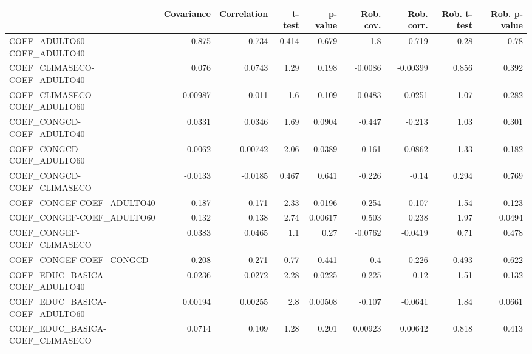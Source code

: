 \begin{tabular}{lrrrrrrrr}
\toprule
{} &  Covariance &  Correlation &  t-test &  p-value &  Rob. cov. &  Rob. corr. &  Rob. t-test &  Rob. p-value \\
\midrule
COEF\_ADULTO60-COEF\_ADULTO40          &       0.875 &        0.734 &  -0.414 &    0.679 &        1.8 &       0.719 &        -0.28 &          0.78 \\
COEF\_CLIMASECO-COEF\_ADULTO40         &       0.076 &       0.0743 &    1.29 &    0.198 &    -0.0086 &    -0.00399 &        0.856 &         0.392 \\
COEF\_CLIMASECO-COEF\_ADULTO60         &     0.00987 &        0.011 &     1.6 &    0.109 &    -0.0483 &     -0.0251 &         1.07 &         0.282 \\
COEF\_CONGCD-COEF\_ADULTO40            &      0.0331 &       0.0346 &    1.69 &   0.0904 &     -0.447 &      -0.213 &         1.03 &         0.301 \\
COEF\_CONGCD-COEF\_ADULTO60            &     -0.0062 &     -0.00742 &    2.06 &   0.0389 &     -0.161 &     -0.0862 &         1.33 &         0.182 \\
COEF\_CONGCD-COEF\_CLIMASECO           &     -0.0133 &      -0.0185 &   0.467 &    0.641 &     -0.226 &       -0.14 &        0.294 &         0.769 \\
COEF\_CONGEF-COEF\_ADULTO40            &       0.187 &        0.171 &    2.33 &   0.0196 &      0.254 &       0.107 &         1.54 &         0.123 \\
COEF\_CONGEF-COEF\_ADULTO60            &       0.132 &        0.138 &    2.74 &  0.00617 &      0.503 &       0.238 &         1.97 &        0.0494 \\
COEF\_CONGEF-COEF\_CLIMASECO           &      0.0383 &       0.0465 &     1.1 &     0.27 &    -0.0762 &     -0.0419 &         0.71 &         0.478 \\
COEF\_CONGEF-COEF\_CONGCD              &       0.208 &        0.271 &    0.77 &    0.441 &        0.4 &       0.226 &        0.493 &         0.622 \\
COEF\_EDUC\_BASICA-COEF\_ADULTO40       &     -0.0236 &      -0.0272 &    2.28 &   0.0225 &     -0.225 &       -0.12 &         1.51 &         0.132 \\
COEF\_EDUC\_BASICA-COEF\_ADULTO60       &     0.00194 &      0.00255 &     2.8 &  0.00508 &     -0.107 &     -0.0641 &         1.84 &        0.0661 \\
COEF\_EDUC\_BASICA-COEF\_CLIMASECO      &      0.0714 &        0.109 &    1.28 &    0.201 &    0.00923 &     0.00642 &        0.818 &         0.413 \\

\end{tabular}
